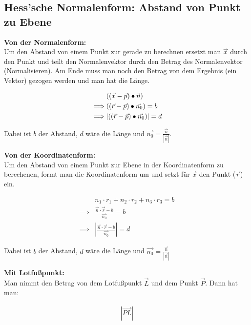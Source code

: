 \subsection{Hess'sche Normalenform: Abstand von Punkt zu Ebene}
\label{sec:hessscheform}

\textbf{Von der Normalenform:} \\
Um den Abstand von einem Punkt zur gerade zu berechnen ersetzt man $\vec{x}$ durch den Punkt und teilt den Normalenvektor durch den Betrag des  Normalenvektor (Normalisieren). Am Ende muss man noch den Betrag von dem Ergebnis (ein Vektor) gezogen werden und man hat die Länge.

\[
\begin{aligned}
    &((\vec{x} - \vec{p}) \bullet \vec{n}) \newline \\
    \implies &((\vec{r} - \vec{p}) \bullet \vec{n_0}) = b \\
    \implies &|((\vec{r} - \vec{p}) \bullet \vec{n_0})| = d
\end{aligned}
\]

Dabei ist $b$ der Abstand, $d$ wäre die Länge und $\vec{n_0} = \frac{\vec{n}}{|\vec{n}|}$.

\vspace{0.5cm}

\textbf{Von der Koordinatenform:} \\
Um den Abstand von einem Punkt zur Ebene in der Koordinatenform zu berechenen, formt man die Koordinatenform um und setzt für $\vec{x}$ den Punkt ($\vec{r}$) ein.

\[
\begin{aligned}
    &n_1\cdot r_1 + n_2\cdot r_2 + n_3\cdot r_3 = b \\
    \implies &\frac{\vec{n}\cdot \vec{r} - b}{\vec{n_0}} = b \\
    \implies &|\frac{\vec{n}\cdot \vec{r} - b}{\vec{n_0}}| = d
\end{aligned}
\]

Dabei ist $b$ der Abstand, $d$ wäre die Länge und $\vec{n_0} = \frac{\vec{n}}{|\vec{n}|}$ 

\vspace{0.5cm}

\textbf{Mit Lotfußpunkt:} \\
Man nimmt den Betrag von dem Lotfußpunkt $\vec{L}$ und dem Punkt $\vec{P}$. Dann hat man: 

\[
\begin{aligned}
    |\overrightarrow{PL}|
\end{aligned}
\]

